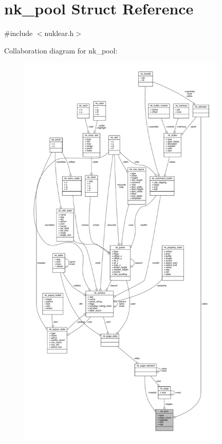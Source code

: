 \hypertarget{structnk__pool}{}\section{nk\+\_\+pool Struct Reference}
\label{structnk__pool}


{\ttfamily \#include $<$nuklear.\+h$>$}



Collaboration diagram for nk\+\_\+pool\+:
\nopagebreak
\begin{figure}[H]
\begin{center}
\leavevmode
\includegraphics[height=550pt]{structnk__pool__coll__graph}
\end{center}
\end{figure}
